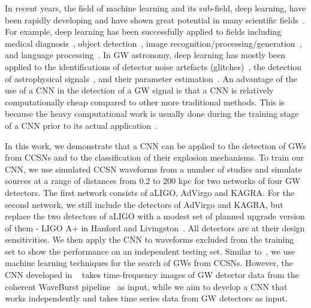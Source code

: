 \documentclass[aps,twocolumn,showpacs,groupedaddress, nofootinbib]{revtex4}  %
\begin{document}
%
% 
In recent years, the field of machine learning and its sub-field, deep
learning, have been rapidly developing and have shown great potential in many
scientific fields~\cite{krizhevsky2012imagenet, NIPS2014_5423,
simonyan2014very, chen2014semantic, zeiler2014visualizing, szegedy2015going}.
For example, deep learning has been successfully applied to fields including
medical diagnosis~\cite{kononenko2001machine}, object
detection~\cite{redmon2016you}, image
recognition/processing/generation~\cite{he2016deep, krizhevsky2012imagenet,
zhang2016colorful, karpathy2015deep}, and  language
processing~\cite{lample2016neural}. In \ac{GW} astronomy, deep learning has
mostly been applied to the identifications of detector noise artefacts
(glitches)~\cite{mukund2017transient, zevin2017gravity, george2017deep}, the
detection of astrophysical signals~\cite{george2018deep, gabbard2018matching, astone2018new},
and their parameter estimation~\cite{2019arXiv190906296G}.
An advantage of the use of a \ac{CNN} in the detection
of a \ac{GW} signal is that a \ac{CNN} is relatively computationally cheap
compared to other more traditional methods. This is because the heavy
computational work is usually done during the training stage of a \ac{CNN}
prior to its actual application~\cite{goodfellow2016deep}.

%
%
In this work, we demonstrate that a \ac{CNN} can be applied to the detection of
\acp{GW} from \acp{CCSN} and to the classification of their explosion
mechanisms. 
To train our \ac{CNN}, we use simulated \ac{CCSN} waveforms from a
number of studies and simulate sources at a range of distances from $0.2$ to
$200$ kpc for two networks of four \ac{GW} detectors. The first network
consists of \ac{aLIGO}, \ac{AdVirgo} and KAGRA. For the second network, we
still include the detectors of \ac{AdVirgo} and KAGRA, but replace the two
detectors of \ac{aLIGO} with a modest set of planned upgrade version of them -
LIGO A+ in Hanford and Livingston~\cite{miller2015prospects, LIGOW}. All detectors 
are at their design sensitivities. We then
apply the \ac{CNN} to waveforms excluded from the training set to show 
the performance on an independent testing set.
Similar to~\cite{astone2018new}, 
we use machine learning techniques for the search of \acp{GW} from \acp{CCSN}.
However, the \ac{CNN} developed in ~\cite{astone2018new} takes time-frequency images of \ac{GW} detector 
data from the coherent WaveBurst pipeline~\cite{klimenko2005constraint} as input, 
while we aim to develop a \ac{CNN} that works independently and takes time series data from \ac{GW} detectors as input.
\end{document}
